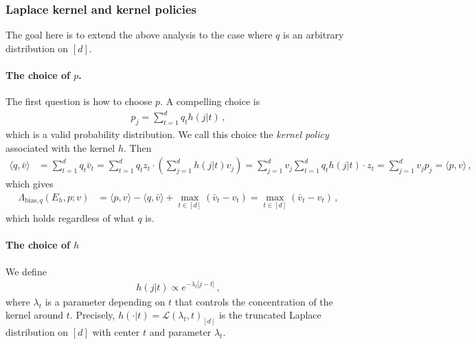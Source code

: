 \documentclass{article}
\theoremstyle{plain}
\theoremstyle{definition}
\theoremstyle{plain}
\newcommand{\cL}{\mathcal L}
\begin{document}
\subsubsection{Laplace kernel and kernel policies}
The goal here is to extend the above analysis to the case where $q$ is an arbitrary distribution on $[d]$.
\paragraph{The choice of $p$.}
The first question is how to choose $p$.
A compelling choice is
\begin{align}
    p_j = \sum_{t=1}^{d} q_t h(j|t)\,,
\end{align}
which is a valid probability distribution.
We call this choice the \emph{kernel policy} associated with the kernel $h$.
Then
\begin{align}
    \langle q, \bar v\rangle & = \sum_{t=1}^d q_t \bar v_t
    = \sum_{t=1}^d q_t z_t \cdot \left(\sum_{j=1}^d h(j|t) v_j\right)
    = \sum_{j=1}^d v_j \sum_{t=1}^d q_t h(j|t) \cdot z_t
    = \sum_{j=1}^d v_j p_j
    = \langle p, v\rangle\,,
\end{align}
which gives
\begin{align}
    \Lambda_{\mathrm{bias},q}(E_h,p;v)
     & = \langle p ,v\rangle-\langle q,\bar v\rangle + \max_{t\in[d]}(\bar v_t-v_t)
    = \max_{t\in[d]}(\bar v_t-v_t)\,,
\end{align}
which holds regardless of what $q$ is.
\paragraph{The choice of $h$}
We define
\begin{align}
    h(j|t) \propto e^{-\lambda_t |j-t|}\,,
\end{align}
where $\lambda_t$ is a parameter depending on $t$ that controls the concentration of the kernel around $t$.
Precisely, $h(\cdot|t) = \cL(\lambda_t, t)_{[d]}$ is the truncated Laplace distribution on $[d]$ with center $t$ and parameter $\lambda_t$.
\end{document}
